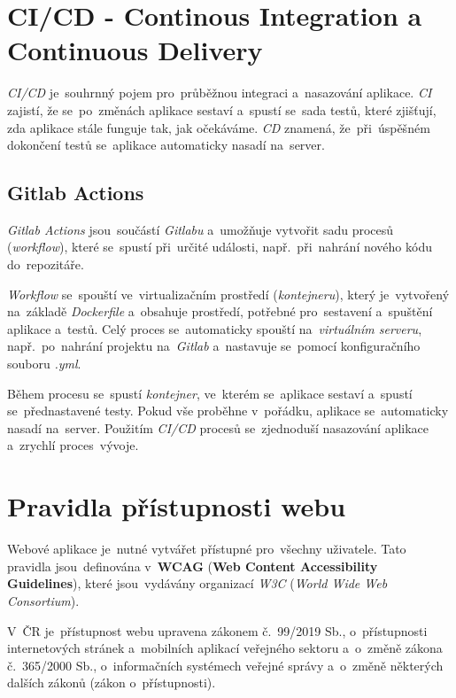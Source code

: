 \documentclass[11pt,a4paper]{report}
\begin{document}
        \section{CI/CD - Continous Integration a Continuous Delivery}
            \emph{CI/CD} je~souhrnný pojem pro~průběžnou integraci a~nasazování aplikace. \emph{CI} zajistí, že se~po~změnách aplikace sestaví a~spustí se~sada testů, které zjišťují, zda aplikace stále funguje tak, jak očekáváme. \emph{CD} znamená, že~při~úspěšném dokončení testů se~aplikace automaticky nasadí na~server. \cite{graham2021ethical}

            \subsection{Gitlab Actions}
                \emph{Gitlab Actions} jsou~součástí \emph{Gitlabu} a~umožňuje vytvořit sadu procesů (\emph{workflow}), které se~spustí při~určité události, např.~při~nahrání nového kódu do~repozitáře.
                
                \emph{Workflow} se~spouští ve~virtualizačním prostředí (\emph{kontejneru}), který je~vytvořený na~základě \emph{Dockerfile} a~obsahuje prostředí, potřebné pro~sestavení a~spuštění aplikace a~testů. Celý proces se~automaticky spouští na~\emph{virtuálním serveru}, např.~po~nahrání projektu na~\emph{Gitlab} a~nastavuje se~pomocí konfiguračního souboru \emph{.yml}.

                Během procesu se~spustí \emph{kontejner}, ve~kterém se~aplikace sestaví a~spustí se~přednastavené testy. Pokud vše proběhne v~pořádku, aplikace se~automaticky nasadí na~server. Použitím \emph{CI/CD} procesů se~zjednoduší nasazování aplikace a~zrychlí proces~vývoje. \cite{gitlab:actions}

        \section{Pravidla přístupnosti webu}
                Webové aplikace je~nutné vytvářet přístupné pro~všechny uživatele. Tato pravidla jsou~definována v~\textbf{WCAG} (\textbf{Web Content Accessibility Guidelines}), které jsou~vydávány organizací \emph{W3C} (\emph{World Wide Web Consortium}).

                V~ČR je~přístupnost webu upravena zákonem č.~99/2019 Sb., o~přístupnosti internetových stránek a~mobilních aplikací veřejného sektoru a~o~změně zákona č.~365/2000 Sb., o~informačních systémech veřejné správy a~o~změně některých dalších zákonů (zákon o~přístupnosti).
\end{document}
